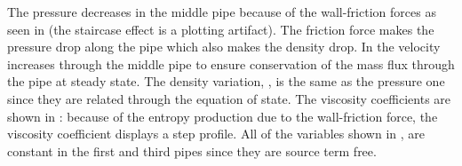 %
The pressure decreases in the middle pipe because of the wall-friction forces as seen in  (the staircase effect is a plotting artifact). The friction force makes the pressure drop along the pipe which also makes the density drop. In  the velocity increases through the middle pipe to ensure conservation of the mass flux through the pipe at steady state. The density variation, , is the same as the pressure one since they are related through the equation of state. The viscosity coefficients are shown in : because of the entropy production due to the wall-friction force, the viscosity coefficient displays a step profile. All of the variables shown in , are constant in the first and third pipes since they are source term free.

